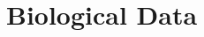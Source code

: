 \documentclass[12pt,twoside]{reedthesis}
\theoremstyle{definition}
\begin{document}
      \chapter{Biological Data}



  \backmatter %

    \nocite{*}


%  
 

\end{document}
